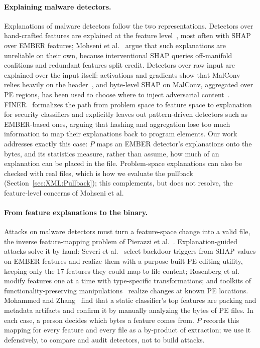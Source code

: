 \paragraph{Explaining malware detectors.} Explanations of malware detectors follow the two representations. Detectors over hand-crafted features are explained at the feature level~\cite{fan2020can, wu2021android, zhu2024dynamic, warnecke2020evaluating}, most often with SHAP over EMBER features; Mohseni et al.~\cite{mohseni2026shap} argue that such explanations are unreliable on their own, because interventional SHAP queries off-manifold coalitions and redundant features split credit. Detectors over raw input are explained over the input itself: activations and gradients show that MalConv relies heavily on the header~\cite{coull2019activation, bose2020explaining, demetrio2019explaining}, and byte-level SHAP on MalConv, aggregated over PE regions, has been used to choose where to inject adversarial content~\cite{aryal2024explainability}. FINER~\cite{he2023finer} formalizes the path from problem space to feature space to explanation for security classifiers and explicitly leaves out pattern-driven detectors such as EMBER-based ones, arguing that hashing and aggregation lose too much information to map their explanations back to program elements. Our work addresses exactly this case: $P$ maps an EMBER detector's explanations onto the bytes, and its statistics measure, rather than assume, how much of an explanation can be placed in the file. Problem-space explanations can also be checked with real files, which is how we evaluate the pullback (Section~\ref{sec:XML:Pullback}); this complements, but does not resolve, the feature-level concerns of Mohseni et al.

\paragraph{From feature explanations to the binary.} Attacks on malware detectors must turn a feature-space change into a valid file, the inverse feature-mapping problem of Pierazzi et al.~\cite{pierazzi2020intriguing}. Explanation-guided attacks solve it by hand: Severi et al.~\cite{severi2021explanation} select backdoor triggers from SHAP values on EMBER features and realize them with a purpose-built PE editing utility, keeping only the 17 features they could map to file content; Rosenberg et al.~\cite{rosenberg2020generating} modify features one at a time with type-specific transformations; and toolkits of functionality-preserving manipulations~\cite{demetrio2021adversarial} realize changes at known PE locations. Mohammed and Zhang~\cite{mohammed2026beyond} find that a static classifier's top features are packing and metadata artifacts and confirm it by manually analyzing the bytes of PE files. In each case, a person decides which bytes a feature comes from. $P$ records this mapping for every feature and every file as a by-product of extraction; we use it defensively, to compare and audit detectors, not to build attacks.

